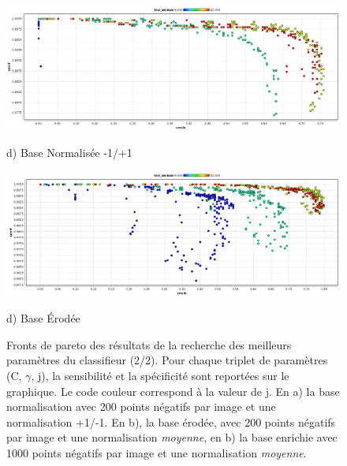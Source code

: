 \begin{figure}[h!]
\label{fig:paretoParams2}
\begin{center}

\includegraphics[width=14cm]{images/pareto_param_range.png}

{\small d) Base Normalisée -1/+1}

\vspace{0.5cm}

\includegraphics[width=14cm]{images/pareto_param_erosion.png}

{\small d) Base \'Erodée}


\end{center}
 \caption{Fronts de pareto des résultats de la recherche des meilleurs paramètres du classifieur (2/2). Pour chaque triplet de paramètres (C, $\gamma$, j), la sensibilité et la spécificité sont reportées sur le graphique. Le code couleur correspond à la valeur de j. En a) la base normalisation avec 200 points négatifs par image et une normalisation +1/-1. En b), la base érodée, avec 200 points négatifs par image et une normalisation \emph{moyenne}, en b) la base enrichie avec 1000 points négatifs par image et une normalisation \emph{moyenne}. }
\end{figure}




